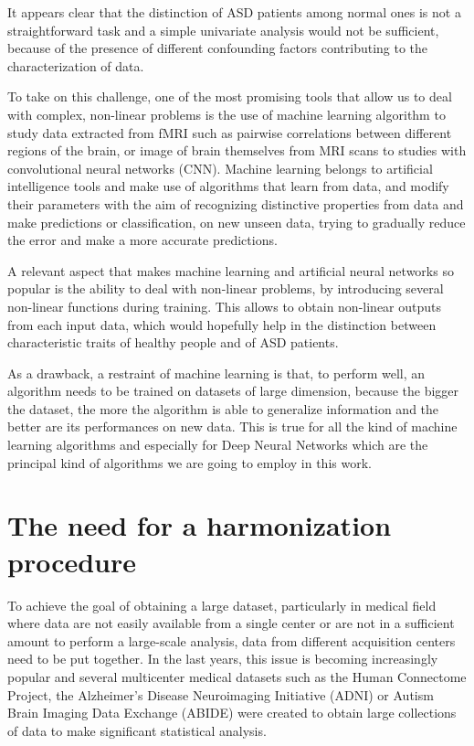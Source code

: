 \documentclass[11pt]{report}
\begin{document}
It appears clear that the distinction of ASD patients among normal ones is not a straightforward task and a simple univariate analysis would not be sufficient, because of the presence of different confounding factors contributing to the characterization of data.

To take on this challenge, one of the most promising tools that allow us to deal with complex, non-linear problems is the use of machine learning algorithm to study data extracted from fMRI such as pairwise correlations between different regions of the brain, or image of brain themselves from MRI scans to studies with convolutional neural networks (CNN).
Machine learning belongs to artificial intelligence tools and make use of algorithms that learn from data, and modify their parameters with the aim of recognizing distinctive properties from data and make predictions or classification, on new unseen data, trying to gradually reduce the error and make a more accurate predictions.

A relevant aspect that makes machine learning and artificial neural networks so popular is the ability to deal with non-linear problems, by introducing several non-linear functions during training.
This allows to obtain non-linear outputs from each input data, which would hopefully help in the distinction between characteristic traits of healthy people and of ASD patients.

As a drawback, a restraint of machine learning is that, to perform well, an algorithm needs to be trained on datasets of large dimension, because the bigger the dataset, the more the algorithm is able to generalize information and the better are its performances on new data.
This is true for all the kind of machine learning algorithms and especially for Deep Neural Networks which are the principal kind of algorithms we are going to employ in this work.

\section{The need for a harmonization procedure}

To achieve the goal of obtaining a large dataset, particularly in medical field where data are not easily available from a single center or are not in a sufficient amount to perform a large-scale analysis, data from different acquisition centers need to be put together.
In the last years, this issue is becoming increasingly popular and several multicenter medical datasets such as the Human Connectome Project, the Alzheimer’s Disease Neuroimaging Initiative (ADNI) or Autism Brain Imaging Data Exchange (ABIDE) were created to obtain large collections of data to make significant statistical analysis.
\end{document}
